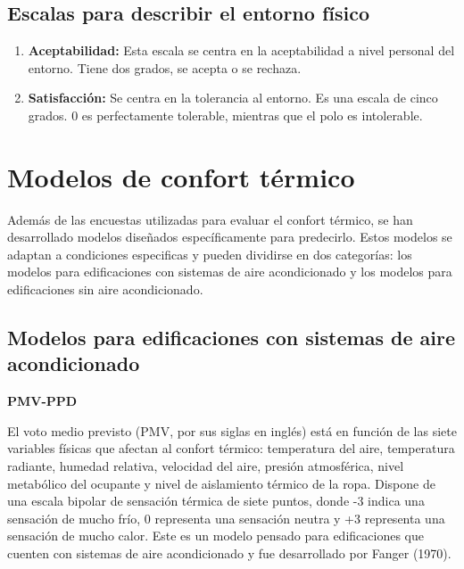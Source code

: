 \documentclass[
  12pt,
  letterpaper,
  DIV=11,
  numbers=noendperiod]{scrreport}
\begin{document}
\hypertarget{escalas-para-describir-el-entorno-fuxedsico}{%
\subsection{Escalas para describir el entorno
físico}\label{escalas-para-describir-el-entorno-fuxedsico}}

\begin{enumerate}
\def\labelenumi{\arabic{enumi}.}
\item
  \textbf{Aceptabilidad:} Esta escala se centra en la aceptabilidad a
  nivel personal del entorno. Tiene dos grados, se acepta o se rechaza.
\item
  \textbf{Satisfacción:} Se centra en la tolerancia al entorno. Es una
  escala de cinco grados. 0 es perfectamente tolerable, mientras que el
  polo es intolerable.
\end{enumerate}

\hypertarget{modelos-de-confort-tuxe9rmico}{%
\section{Modelos de confort
térmico}\label{modelos-de-confort-tuxe9rmico}}

Además de las encuestas utilizadas para evaluar el confort térmico, se
han desarrollado modelos diseñados específicamente para predecirlo.
Estos modelos se adaptan a condiciones especificas y pueden dividirse en
dos categorías: los modelos para edificaciones con sistemas de aire
acondicionado y los modelos para edificaciones sin aire acondicionado.

\hypertarget{modelos-para-edificaciones-con-sistemas-de-aire-acondicionado}{%
\subsection{Modelos para edificaciones con sistemas de aire
acondicionado}\label{modelos-para-edificaciones-con-sistemas-de-aire-acondicionado}}

\textbf{PMV-PPD}

El voto medio previsto (PMV, por sus siglas en inglés) está en función
de las siete variables físicas que afectan al confort térmico:
temperatura del aire, temperatura radiante, humedad relativa, velocidad
del aire, presión atmosférica, nivel metabólico del ocupante y nivel de
aislamiento térmico de la ropa. Dispone de una escala bipolar de
sensación térmica de siete puntos, donde -3 indica una sensación de
mucho frío, 0 representa una sensación neutra y +3 representa una
sensación de mucho calor. Este es un modelo pensado para edificaciones
que cuenten con sistemas de aire acondicionado y fue desarrollado por
Fanger (1970).
\end{document}

